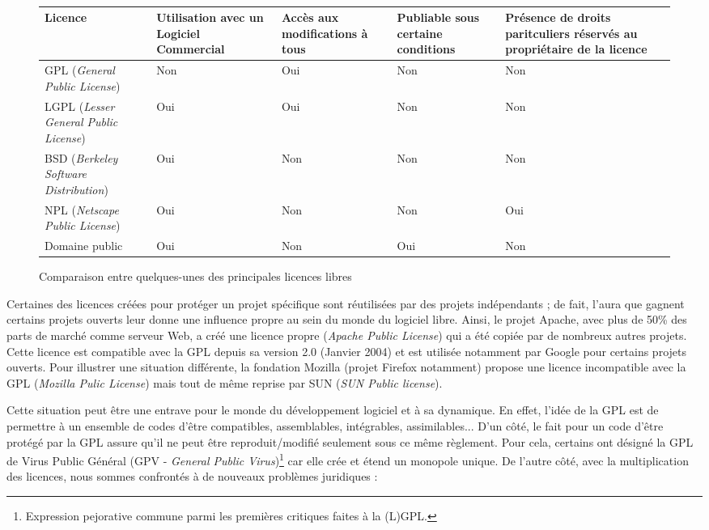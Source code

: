 \begin{figure}[htb]
\begin{center}
\caption{Comparaison entre quelques-unes des principales licences libres} \label{fig1.3}
\\
\begin{tabular}{|p{4cm}|p{2cm}|p{2cm}|p{2cm}|p{2cm}|}
\hline
Licence & Utilisation avec un Logiciel Commercial & Accès aux modifications à tous & Publiable sous certaine conditions & Présence de droits paritculiers réservés au propriétaire de la licence \\
\hline
GPL (\emph{General Public License}) & Non & Oui & Non & Non \\
\hline
LGPL (\emph{Lesser General Public License}) & Oui & Oui & Non & Non \\
\hline
BSD (\emph{Berkeley Software Distribution}) & Oui & Non & Non & Non \\
\hline
NPL (\emph{Netscape Public License}) & Oui & Non & Non & Oui \\
\hline
Domaine public & Oui & Non & Oui & Non \\
\hline

\end{tabular}
\end{center}
\end{figure}

Certaines des licences créées pour protéger un projet spécifique sont réutilisées par des projets indépendants ; de fait, l'aura que gagnent certains projets ouverts leur donne une influence propre au sein du monde du logiciel libre. Ainsi, le projet Apache, avec plus de 50\% des parts de marché comme serveur Web, a créé une licence propre (\emph{Apache Public License}) qui a été copiée par de nombreux autres projets. Cette licence est compatible avec la GPL depuis sa version 2.0 (Janvier 2004) et est utilisée notamment par Google pour certains projets ouverts. Pour illustrer une situation différente, la fondation Mozilla (projet Firefox notamment) propose une licence incompatible avec la GPL (\emph{Mozilla Pulic License}) mais tout de même reprise par SUN (\emph{SUN Public license}).

Cette situation peut être une entrave pour le monde du développement logiciel et à sa dynamique. En effet, l'idée de la GPL est de permettre à un ensemble de codes d'être compatibles, assemblables, intégrables, assimilables... D'un côté, le fait pour un code d'être protégé par la GPL assure qu'il ne peut être reproduit/modifié seulement sous ce même règlement. Pour cela, certains ont désigné la GPL de Virus Public Général (GPV - \emph{General Public Virus})\footnote{Expression pejorative commune parmi les premières critiques faites à la (L)GPL.} car elle crée et étend un monopole unique. De l'autre côté, avec la multiplication des licences, nous sommes confrontés à de nouveaux problèmes juridiques :

